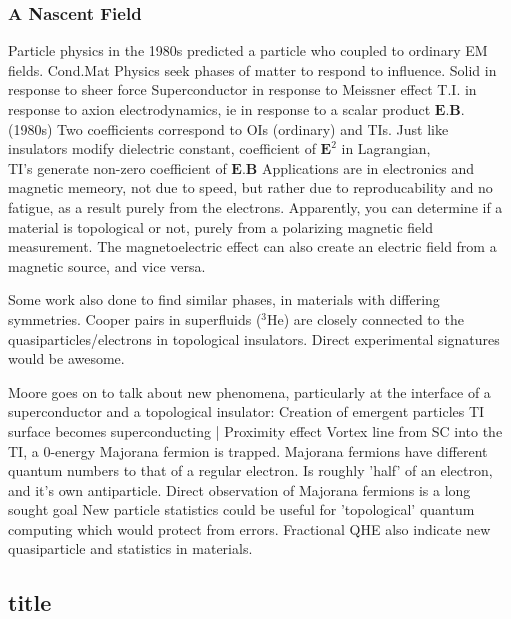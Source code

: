 \documentclass{article} %
\begin{document}
	\subsubsection{A Nascent Field}
	\begin{outline}
		\1 Particle physics in the 1980s predicted a particle who coupled to ordinary EM fields.
		\1 Cond.Mat Physics seek phases of matter to respond to influence. 
			\2 Solid in response to sheer force
			\2 Superconductor in response to Meissner effect
			\2 T.I. in response to axion electrodynamics, ie in response to a scalar product $\textbf{E}.\textbf{B}$. (1980s)
				\3 Two coefficients correspond to OIs (ordinary) and TIs.
		\1 Just like insulators modify dielectric constant, coefficient of $\textbf{E}^2$ in Lagrangian, \\TI's generate non-zero coefficient of $\textbf{E.B}$
		\1 Applications are in electronics and magnetic memeory, not due to speed, but rather due to reproducability and no fatigue, as a result purely from the electrons.
		\1 Apparently, you can determine if a material is topological or not, purely from a polarizing magnetic field measurement.
		\1 The magnetoelectric effect can also create an electric field from a magnetic source, and vice versa. 
		
		\1 Some work also done to find similar phases, in materials with differing symmetries. Cooper pairs in superfluids ($^3$He) are closely connected to the quasiparticles/electrons in topological insulators. Direct experimental signatures would be awesome.
		
		\1 Moore goes on to talk about new phenomena, particularly at the interface of a superconductor and a topological insulator:
			\2 Creation of emergent particles
			\2 TI surface becomes superconducting | Proximity effect
				\3 Vortex line from SC into the TI, a 0-energy Majorana fermion is trapped.
				\3 Majorana fermions have different quantum numbers to that of a regular electron.
				\3 Is roughly 'half' of an electron,  and it's own antiparticle.
			\2 Direct observation of Majorana fermions is a long sought goal
			\2 New particle statistics could be useful for 'topological' quantum computing which would protect from errors.
			\2 Fractional QHE also indicate new quasiparticle and statistics in materials.
	\end{outline}

\subsection{title}




\end{document}
